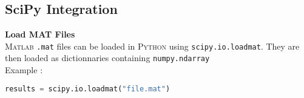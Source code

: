\subsection{SciPy Integration}

\textbf{Load MAT Files}\\

\textsc{Matlab} {\tt .mat} files can be loaded in \textsc{Python} using {\tt scipy.io.loadmat}. They are then loaded as dictionnaries containing {\tt numpy.ndarray}\\

Example :

\begin{lstlisting}[language=Python]
results = scipy.io.loadmat("file.mat")
\end{lstlisting}